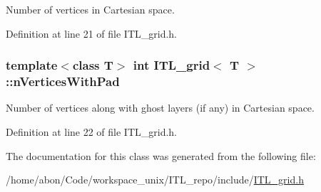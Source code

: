 Number of vertices in Cartesian space. 



Definition at line 21 of file ITL\_\-grid.h.

\hypertarget{classITL__grid_a152743e564ed5b265c62c8462507e033}{
\subsubsection[{nVerticesWithPad}]{\setlength{\rightskip}{0pt plus 5cm}template$<$class T$>$ int {\bf ITL\_\-grid}$<$ T $>$::{\bf nVerticesWithPad}}}
\label{classITL__grid_a152743e564ed5b265c62c8462507e033}


Number of vertices along with ghost layers (if any) in Cartesian space. 



Definition at line 22 of file ITL\_\-grid.h.



The documentation for this class was generated from the following file:\begin{DoxyCompactItemize}
\item 
/home/abon/Code/workspace\_\-unix/ITL\_\-repo/include/\hyperlink{ITL__grid_8h}{ITL\_\-grid.h}\end{DoxyCompactItemize}
